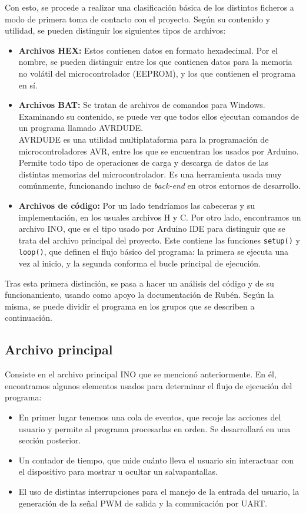 Con esto, se procede a realizar una clasificación básica de los distintos ficheros a modo de primera toma de contacto con el proyecto. Según su contenido y utilidad, se pueden distinguir los siguientes tipos de archivos:

\begin{itemize}
    \item{\textbf{Archivos HEX:}} Estos contienen datos en formato hexadecimal. Por el nombre, se pueden distinguir entre los que contienen datos para la memoria no volátil del microcontrolador (EEPROM), y los que contienen el programa en sí.
    \item{\textbf{Archivos BAT:}} Se tratan de archivos de comandos para Windows. Examinando su contenido, se puede ver que todos ellos ejecutan comandos de un programa llamado AVRDUDE.\\
    AVRDUDE es una utilidad multiplataforma para la programación de microcontroladores AVR, entre los que se encuentran los usados por Arduino. Permite todo tipo de operaciones de carga y descarga de datos de las distintas memorias del microcontrolador. Es una herramienta usada muy comúnmente, funcionando incluso de \textit{back-end} en otros entornos de desarrollo.
    \item{\textbf{Archivos de código:}} Por un lado tendríamos las cabeceras y su implementación, en los usuales archivos H y C. Por otro lado, encontramos un archivo INO, que es el tipo usado por Arduino IDE para distinguir que se trata del archivo principal del proyecto. Este contiene las funciones \verb|setup()| y \verb|loop()|, que definen el flujo básico del programa: la primera se ejecuta una vez al inicio, y la segunda conforma el bucle principal de ejecución.
\end{itemize}

Tras esta primera distinción, se pasa a hacer un análisis del código y de su funcionamiento, usando como apoyo la documentación de Rubén. Según la misma, se puede dividir el programa en los grupos que se describen a continuación.

\subsection{Archivo principal}

Consiste en el archivo principal INO que se mencionó anteriormente. En él, encontramos algunos elementos usados para determinar el flujo de ejecución del programa:

\begin{itemize}
    \item En primer lugar tenemos una cola de eventos, que recoje las acciones del usuario y permite al programa procesarlas en orden. Se desarrollará en una sección posterior.
    \item Un contador de tiempo, que mide cuánto lleva el usuario sin interactuar con el dispositivo para mostrar u ocultar un salvapantallas.
    \item El uso de distintas interrupciones para el manejo de la entrada del usuario, la generación de la señal PWM de salida y la comunicación por UART. \end{itemize}

